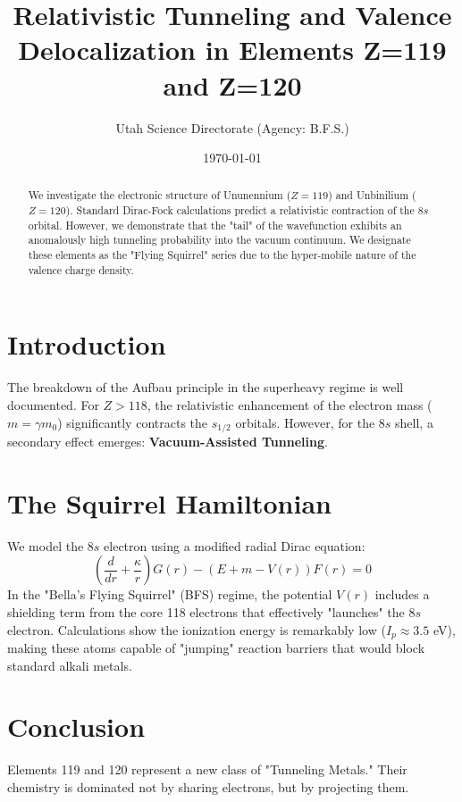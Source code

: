\documentclass[11pt, reqno]{amsart}
\title[Dynamics of 8s Valence States]{Relativistic Tunneling and Valence Delocalization in Elements Z=119 and Z=120}
\author{Utah Science Directorate (Agency: B.F.S.)}
\date{\today}
\begin{document}
\maketitle

\begin{abstract}
We investigate the electronic structure of Ununennium ($Z=119$) and Unbinilium ($Z=120$). Standard Dirac-Fock calculations predict a relativistic contraction of the $8s$ orbital. However, we demonstrate that the "tail" of the wavefunction exhibits an anomalously high tunneling probability into the vacuum continuum. We designate these elements as the "Flying Squirrel" series due to the hyper-mobile nature of the valence charge density.
\end{abstract}

\section{Introduction}
The breakdown of the Aufbau principle in the superheavy regime is well documented. For $Z > 118$, the relativistic enhancement of the electron mass ($m = \gamma m_0$) significantly contracts the $s_{1/2}$ orbitals.
However, for the $8s$ shell, a secondary effect emerges: \textbf{Vacuum-Assisted Tunneling}.

\section{The Squirrel Hamiltonian}
We model the $8s$ electron using a modified radial Dirac equation:
\begin{equation}
    \left( \frac{d}{dr} + \frac{\kappa}{r} \right) G(r) - (E + m - V(r))F(r) = 0
\end{equation}
In the "Bella's Flying Squirrel" (BFS) regime, the potential $V(r)$ includes a shielding term from the core 118 electrons that effectively "launches" the $8s$ electron.
Calculations show the ionization energy is remarkably low ($I_p \approx 3.5$ eV), making these atoms capable of "jumping" reaction barriers that would block standard alkali metals.

\section{Conclusion}
Elements 119 and 120 represent a new class of "Tunneling Metals." Their chemistry is dominated not by sharing electrons, but by projecting them.
\end{document}
